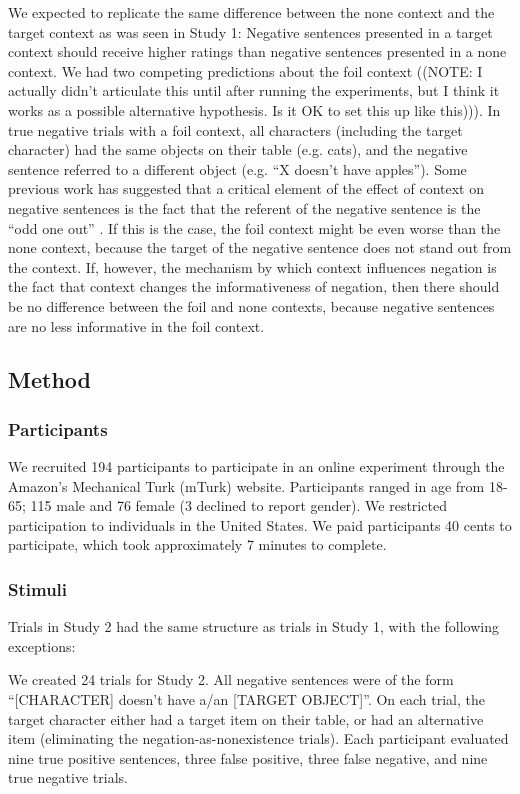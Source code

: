 \documentclass[10pt,letterpaper]{article}
\begin{document}
We expected to replicate the same difference between the none context and the target context as was seen in Study 1: Negative sentences presented in a target context should receive higher ratings than negative sentences presented in a none context.  We had two competing predictions about the foil context ((NOTE: I actually didn't articulate this until after running the experiments, but I think it works as a possible alternative hypothesis.  Is it OK to set this up like this))).  In true negative trials with a foil context, all characters (including the target character) had the same objects on their table (e.g. cats), and the negative sentence referred to a different object (e.g. ``X doesn't have apples'').  Some previous work has suggested that a critical element of the effect of context on negative sentences is the fact that the referent of the negative sentence is the ``odd one out'' \cite{wason1965}.  If this is the case, the foil context might be even worse than the none context, because the target of the negative sentence does not stand out from the context.  If, however, the mechanism by which context influences negation is the fact that context changes the informativeness of negation, then there should be no difference between the foil and none contexts, because negative sentences are no less informative in the foil context.  

\subsection{Method}

\subsubsection{Participants}
We recruited 194 participants to participate in an online experiment through the Amazon's Mechanical Turk (mTurk) website.  Participants ranged in age from 18-65; 115 male and 76 female (3 declined to report gender).  We restricted participation to individuals in the United States. We paid participants 40 cents to participate, which took approximately 7 minutes to complete.  


\subsubsection{Stimuli}
Trials in Study 2 had the same structure as trials in Study 1, with the following exceptions:

We created 24 trials for Study 2.  All negative sentences were of the form ``[CHARACTER] doesn't have a/an [TARGET OBJECT]''.  On each trial, the target character either had a target item on their table, or had an alternative item (eliminating the negation-as-nonexistence trials).  Each participant evaluated nine true positive sentences, three false positive, three false negative, and nine true negative trials.
\end{document}
